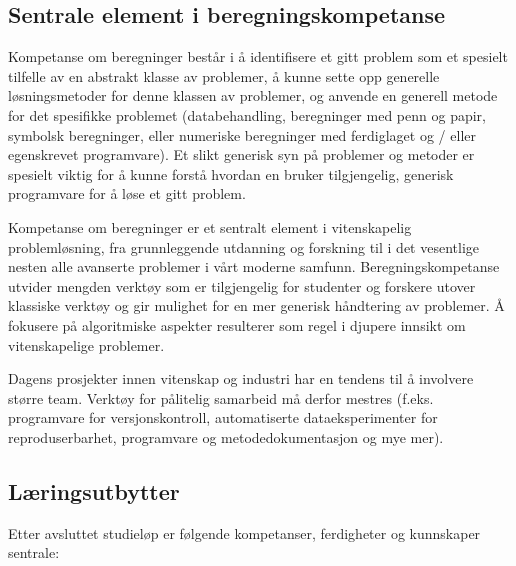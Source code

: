 \documentclass{article}
\begin{document}
\subsection{Sentrale element i beregningskompetanse}
Kompetanse om beregninger består i å identifisere et gitt problem som et spesielt tilfelle av en abstrakt klasse av problemer, å kunne sette opp generelle løsningsmetoder for denne klassen av problemer, og anvende en generell metode for det spesifikke problemet (databehandling, beregninger med penn og papir, symbolsk beregninger, eller
numeriske beregninger med ferdiglaget og / eller egenskrevet programvare). Et slikt 
generisk syn på problemer og metoder er spesielt viktig for
å kunne forstå hvordan en bruker tilgjengelig, generisk programvare for å løse et gitt problem.

Kompetanse om beregninger er et sentralt element
i vitenskapelig problemløsning, fra grunnleggende utdanning og forskning til
i det vesentlige nesten alle avanserte problemer i vårt moderne
samfunn. Beregningskompetanse  utvider mengden verktøy som er tilgjengelig for studenter og
forskere utover klassiske verktøy og gir mulighet for en mer generisk
håndtering av problemer. Å fokusere på algoritmiske aspekter resulterer som regel i
djupere innsikt om vitenskapelige problemer.

Dagens prosjekter innen vitenskap og industri har en tendens til å involvere større team. Verktøy for pålitelig samarbeid må derfor mestres (f.eks. programvare for versjonskontroll, automatiserte dataeksperimenter for reproduserbarhet, programvare og metodedokumentasjon og mye mer).

\subsection{Læringsutbytter }
Etter avsluttet studieløp er følgende kompetanser, ferdigheter og kunnskaper sentrale:
\end{document}
